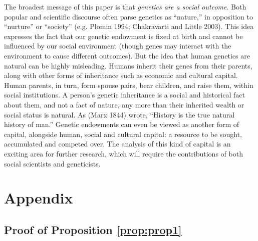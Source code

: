 \documentclass[
]{article}
\begin{document}
The broadest message of this paper is that \emph{genetics are a social
outcome}. Both popular and scientific discourse often parse genetics as
``nature,'' in opposition to ``nurture'' or ``society'' (e.g. Plomin 1994; Chakravarti and Little 2003). This idea expresses the
fact that our genetic endowment is fixed at birth and cannot be
influenced by our social environment (though genes may interact with the
environment to cause different outcomes). But the idea that human
genetics are natural can be highly misleading. Humans inherit their
genes from their parents, along with other forms of inheritance such as
economic and cultural capital. Human parents, in turn, form spouse
pairs, bear children, and raise them, within social institutions. A
person's genetic inheritance is a social and historical fact about them,
and not a fact of nature, any more than their inherited wealth or social
status is natural. As (Marx 1844) wrote, ``History is the true
natural history of man.'' Genetic endowments can even be viewed as
another form of capital, alongside human, social and cultural capital: a
resource to be sought, accumulated and competed over. The analysis of
this kind of capital is an exciting area for further research, which
will require the contributions of both social scientists and
geneticists.

\FloatBarrier

\newpage

\hypertarget{appendix}{%
\section{Appendix}\label{appendix}}

\hypertarget{proof-of-proposition-refpropprop1}{%
\subsection{Proof of Proposition \ref{prop:prop1}}\label{proof-of-proposition-refpropprop1}}
\end{document}
